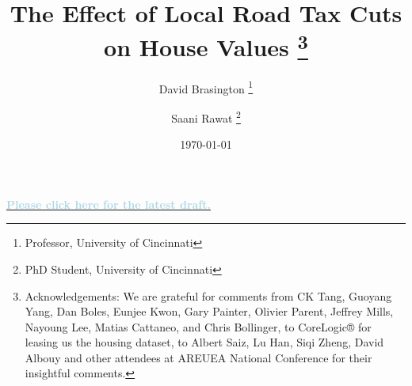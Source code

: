 \documentclass[12pt]{article}
\begin{document}
\begin{titlepage}
\title{The Effect of Local Road Tax Cuts on House Values
\thanks{Acknowledgements: We are grateful for comments from CK Tang, Guoyang Yang, Dan Boles, Eunjee Kwon, Gary Painter, Olivier Parent, Jeffrey Mills, Nayoung Lee, Matias Cattaneo, and Chris Bollinger, to CoreLogic® for leasing us the housing dataset, to Albert Saiz, Lu Han, Siqi Zheng, David Albouy and other attendees at AREUEA National Conference for their insightful comments.}}
\author{David Brasington \thanks{Professor, University of Cincinnati} \and Saani Rawat \thanks{PhD Student, University of Cincinnati}}
\date{\today} 
\maketitle

\noindent
\begin{center}
\textbf{\href{https://drive.google.com/file/d/1BQ7jFNJ6AW3Hu9kAJQLw6NlZSjhXQ7Jh/view?usp=sharing}{\textcolor{lightblue}{Please click here for the latest draft.}}}
\end{center}


\end{titlepage}
\end{document}
